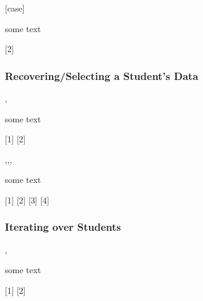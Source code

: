 \documentclass[10pt]{article}
\begin{document}
\begin{codedescribe}{\studentgrade}
\begin{codesyntax}
  \tsmacro{\studentgrade}[case]{}
\end{codesyntax}  
some text
\end{codedescribe}

[2]


\subsubsection{Recovering/Selecting a Student's Data}

\begin{codedescribe}{\studentselect,\studentreviewerselect}
\begin{codesyntax}
\end{codesyntax}
 some text
\end{codedescribe}

[1]
[2]

\begin{codedescribe}{\studentcase,\studentadvcase,\studentcoadvcase,\studentreviewersetcase}
\begin{codesyntax}
\end{codesyntax}
 some text
\end{codedescribe}

[1]
[2]
[3]
[4]


\subsubsection{Iterating over Students}

\begin{codedescribe}{\studentiterate,\studentadvisoriterate}
  \begin{codesyntax}
  \end{codesyntax}
  some text
\end{codedescribe}

[1]
[2]
\end{document}
